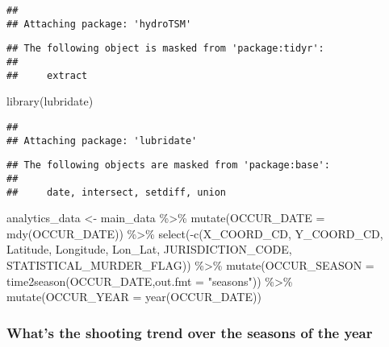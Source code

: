\documentclass[
]{article}
\newenvironment{Shaded}{\begin{snugshade}}{\end{snugshade}}
\newcommand{\AttributeTok}[1]{\textcolor[rgb]{0.77,0.63,0.00}{#1}}
\newcommand{\FunctionTok}[1]{\textcolor[rgb]{0.00,0.00,0.00}{#1}}
\newcommand{\NormalTok}[1]{#1}
\newcommand{\OtherTok}[1]{\textcolor[rgb]{0.56,0.35,0.01}{#1}}
\newcommand{\SpecialCharTok}[1]{\textcolor[rgb]{0.00,0.00,0.00}{#1}}
\newcommand{\StringTok}[1]{\textcolor[rgb]{0.31,0.60,0.02}{#1}}
\begin{document}
\begin{verbatim}
## 
## Attaching package: 'hydroTSM'
\end{verbatim}

\begin{verbatim}
## The following object is masked from 'package:tidyr':
## 
##     extract
\end{verbatim}

\begin{Shaded}
\begin{Highlighting}[]
\FunctionTok{library}\NormalTok{(lubridate)}
\end{Highlighting}
\end{Shaded}

\begin{verbatim}
## 
## Attaching package: 'lubridate'
\end{verbatim}

\begin{verbatim}
## The following objects are masked from 'package:base':
## 
##     date, intersect, setdiff, union
\end{verbatim}

\begin{Shaded}
\begin{Highlighting}[]
\NormalTok{analytics\_data }\OtherTok{\textless{}{-}}\NormalTok{ main\_data }\SpecialCharTok{\%\textgreater{}\%} \FunctionTok{mutate}\NormalTok{(}\AttributeTok{OCCUR\_DATE =} \FunctionTok{mdy}\NormalTok{(OCCUR\_DATE)) }\SpecialCharTok{\%\textgreater{}\%} \FunctionTok{select}\NormalTok{(}\SpecialCharTok{{-}}\FunctionTok{c}\NormalTok{(X\_COORD\_CD, Y\_COORD\_CD, Latitude, Longitude, Lon\_Lat, JURISDICTION\_CODE, STATISTICAL\_MURDER\_FLAG)) }\SpecialCharTok{\%\textgreater{}\%}
\FunctionTok{mutate}\NormalTok{(}\AttributeTok{OCCUR\_SEASON =} \FunctionTok{time2season}\NormalTok{(OCCUR\_DATE,}\AttributeTok{out.fmt =} \StringTok{"seasons"}\NormalTok{)) }\SpecialCharTok{\%\textgreater{}\%} \FunctionTok{mutate}\NormalTok{(}\AttributeTok{OCCUR\_YEAR =} \FunctionTok{year}\NormalTok{(OCCUR\_DATE)) }
\end{Highlighting}
\end{Shaded}

\hypertarget{whats-the-shooting-trend-over-the-seasons-of-the-year}{%
\subsubsection{What's the shooting trend over the seasons of the
year}\label{whats-the-shooting-trend-over-the-seasons-of-the-year}}
\end{document}

